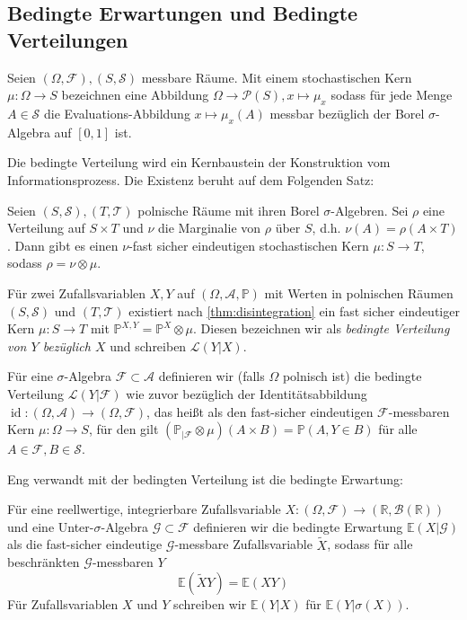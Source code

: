 \subsection{Bedingte Erwartungen und Bedingte Verteilungen}
\begin{definition}
Seien $(\Omega, \mathcal{F}), (S, \mathcal{S})$ messbare Räume. Mit einem stochastischen Kern $\mu:\Omega \rightarrow S$ bezeichnen eine Abbildung $\Omega \rightarrow \mathcal{P}(S), x\mapsto \mu_x$ sodass für jede Menge $A \in \mathcal{S}$ die Evaluations-Abbildung $x \mapsto \mu_x(A)$ messbar bezüglich der Borel $\sigma$-Algebra auf $[0,1]$ ist.
\end{definition}
Die bedingte Verteilung wird ein Kernbaustein der Konstruktion vom Informationsprozess. Die Existenz beruht auf dem Folgenden Satz:
\begin{theorem}\label{thm:disintegration}
Seien $(S, \mathcal{S}), (T,\mathcal{T})$ polnische Räume mit ihren Borel $\sigma$-Algebren. Sei $\rho$ eine Verteilung auf $S\times T$ und $\nu$ die Marginalie von $\rho$ über $S$, d.h. $\nu(A) = \rho(A\times T)$. Dann gibt es einen $\nu$-fast sicher eindeutigen stochastischen Kern $\mu:S\rightarrow T$, sodass $\rho = \nu \otimes \mu$.
\end{theorem}
\begin{definition}
Für zwei Zufallsvariablen $X, Y$ auf $(\Omega, \mathcal{A}, \mathbb{P})$ mit Werten in polnischen Räumen $(S, \mathcal{S})$ und $(T, \mathcal{T})$ existiert nach \ref{thm:disintegration} ein fast sicher eindeutiger Kern $\mu: S\rightarrow T$ mit $\mathbb{P}^{X, Y}=\mathbb{P}^X\otimes \mu$. Diesen bezeichnen wir als \emph{bedingte Verteilung von $Y$ bezüglich $X$} und schreiben $\mathcal{L}(Y \vert X)$.

Für eine $\sigma$-Algebra $\mathcal{F} \subset \mathcal{A}$ definieren wir (falls $\Omega$ polnisch ist) die bedingte Verteilung $\mathcal{L}(Y\vert \mathcal{F})$ wie zuvor bezüglich der Identitätsabbildung $\operatorname{id}:(\Omega, \mathcal{A}) \rightarrow (\Omega, \mathcal{F})$, das heißt als den fast-sicher eindeutigen $\mathcal{F}$-messbaren Kern $\mu:\Omega\rightarrow S$, für den gilt $\left(\mathbb{P}_{\vert \mathcal{F}} \otimes \mu\right)(A\times B)=\mathbb{P}(A, Y\in B)$ für alle $A \in \mathcal{F}, B\in \mathcal{S}$.
\end{definition}
Eng verwandt mit der bedingten Verteilung ist die bedingte Erwartung:
\begin{definition}
Für eine reellwertige, integrierbare Zufallsvariable $X: (\Omega, \mathcal{F}) \rightarrow (\mathbb{R}, \mathcal{B}(\mathbb{R}))$ und eine Unter-$\sigma$-Algebra $\mathcal{G}\subset \mathcal{F}$ definieren wir die bedingte Erwartung $\mathbb{E}(X\vert \mathcal{G})$ als die fast-sicher eindeutige $\mathcal{G}$-messbare Zufallsvariable $\tilde{X}$, sodass für alle beschränkten $\mathcal{G}$-messbaren $Y$
$$\mathbb{E}(\tilde{X}Y) = \mathbb{E}(XY)$$
Für Zufallsvariablen $X$ und $Y$ schreiben wir $\mathbb{E}(Y\vert X)$ für $\mathbb{E}(Y \vert \sigma(X))$.
\end{definition}
